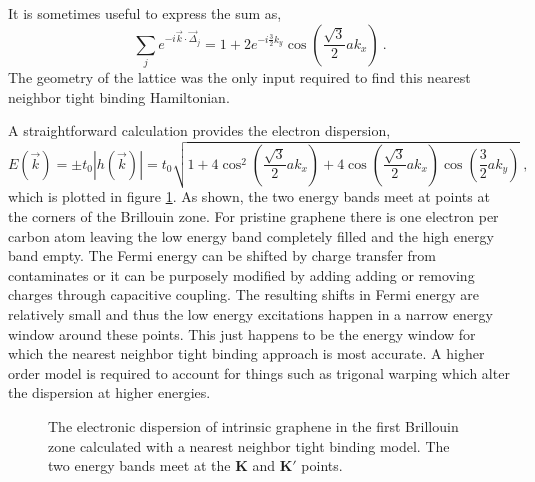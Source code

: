 It is sometimes useful to express the sum as,
\begin{equation*}
	\sum_{j} e^{-i \vec{k} \cdot \vec{\Delta}_j}
		=1+2 e^{-i \frac{3}{2} k_y}\cos \left(\frac{\sqrt{3}}{2} a k_x \right) \ .
\end{equation*}
The geometry of the lattice was the only input required to find this nearest neighbor tight binding Hamiltonian.

A straightforward calculation provides the electron dispersion,
\begin{equation*}
	E(\vec{k})=\pm t_0 |h(\vec{k})|=t_0 \sqrt{1+4 \cos^2 \left(\frac{\sqrt{3}}{2} a k_x\right)
		+4 \cos\left(\frac{\sqrt{3}}{2} a k_x \right) \cos \left(\frac{3}{2} a k_y\right)} \ ,
\end{equation*}
which is plotted in figure \ref{fig:TB:Dispersion}.
As shown, the two energy bands meet at points at the corners of the Brillouin zone.
For pristine graphene there is one electron per carbon atom leaving the low energy band completely filled and the high energy band empty.
The Fermi energy can be shifted by charge transfer from contaminates or it can be purposely modified by adding adding or removing charges through capacitive coupling.
The resulting shifts in Fermi energy are relatively small and thus the low energy excitations happen in a narrow energy window around these points.
This just happens to be the energy window for which the nearest neighbor tight binding approach is most accurate.
A higher order model is required to account for things such as trigonal warping which alter the dispersion at higher energies.

\begin{figure}
	\begin{center}
	
	\end{center}
	\caption[The electronic dispersion of intrinsic graphene]{\label{fig:TB:Dispersion} The electronic dispersion of intrinsic graphene in the first Brillouin zone calculated with a nearest neighbor tight binding model.  The two energy bands meet at the $\bm{K}$ and $\bm{K'}$ points.}	
\end{figure}


